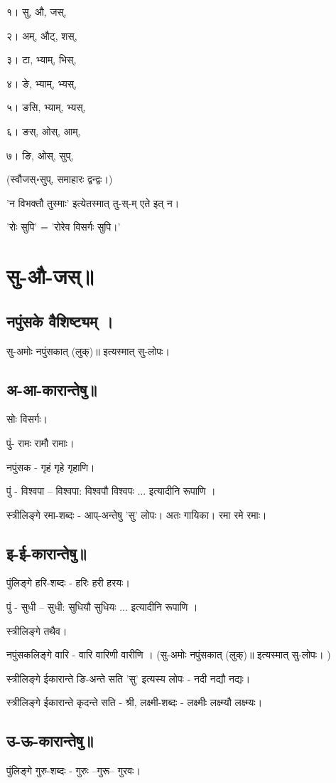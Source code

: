 \documentclass[oneside, article]{memoir}
\begin{document}
१। सु, औ, जस्, 

२। अम्, औट्, शस्, 

३। टा, भ्याम्, भिस्, 

४। ङे, भ्याम्, भ्यस्, 

५। ङसि, भ्याम्, भ्यस्, 

६। ङस्, ओस्, आम्, 

७। ङि, ओस्, सुप्, 

(स्वौजस्॰सुप्, समाहारः द्वन्द्वः।)

'न विभक्तौ तुस्माः' इत्येतस्मात् तु-स्-म् एते इत् न।

'रोः सुपि' = 'रोरेव विसर्गः सुपि।'

\section{सु-औ-जस्॥}
\subsection{नपुंसके वैशिष्ट्यम् ।}
सु-अमोः नपुंसकात् (लुक्)॥ इत्यस्मात् सु-लोपः।

\subsection{अ-आ-कारान्तेषु॥}
सोः विसर्गः।

पुं- रामः रामौ रामाः।

नपुंसक - गृहं गृहे गृहाणि।

पुं - विश्वपा -- विश्वपा: विश्वपौ विश्वपः ... इत्यादीनि रूपाणि ।

स्त्रीलिङ्गे रमा-शब्दः - आप्-अन्तेषु 'सु' लोपः। अतः गायिका। रमा रमे रमाः।

\subsection{इ-ई-कारान्तेषु॥}
पुंलिङ्गे हरि-शब्दः - हरिः हरी हरयः।

पुं - सुधी -- सुधी: सुधियौ सुधियः ... इत्यादीनि रूपाणि ।

स्त्रीलिङ्गे तथैव।

नपुंसकलिङ्गे वारि - वारि वारिणी वारीणि । (सु-अमोः नपुंसकात् (लुक्)॥ इत्यस्मात् सु-लोपः। )

स्त्रीलिङ्गे ईकारान्ते ङि-अन्ते सति 'सु' इत्यस्य लोपः - नदी नद्यौ नद्यः।

स्त्रीलिङ्गे ईकारान्ते कृदन्ते सति - श्री, लक्ष्मी-शब्दः - लक्ष्मीः लक्ष्म्यौ लक्ष्म्यः। 

\subsection{उ-ऊ-कारान्तेषु॥}
पुंलिङ्गे गुरु-शब्दः - गुरुः --गुरू-- गुरवः।
\end{document}
